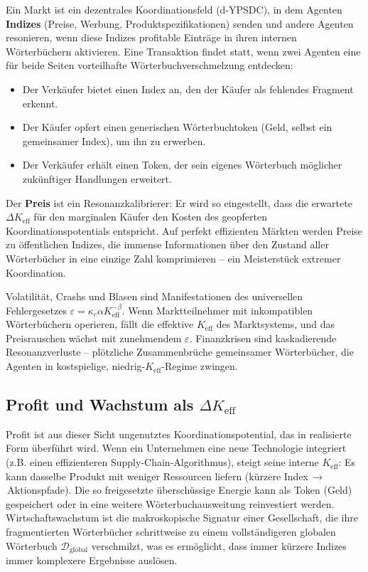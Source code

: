 \documentclass[12pt,a4paper]{article}
\newcommand{\Keff}{K_{\mathrm{eff}}}
\begin{document}
Ein Markt ist ein dezentrales Koordinationsfeld (d‑YPSDC), in dem Agenten \textbf{Indizes} (Preise, Werbung, Produktspezifikationen) senden und andere Agenten resonieren, wenn diese Indizes profitable Einträge in ihren internen Wörterbüchern aktivieren. Eine Transaktion findet statt, wenn zwei Agenten eine für beide Seiten vorteilhafte Wörterbuchverschmelzung entdecken:
\begin{itemize}[leftmargin=*]
	\item Der Verkäufer bietet einen Index an, den der Käufer als fehlendes Fragment erkennt.
	\item Der Käufer opfert einen generischen Wörterbuchtoken (Geld, selbst ein gemeinsamer Index), um ihn zu erwerben.
	\item Der Verkäufer erhält einen Token, der sein eigenes Wörterbuch möglicher zukünftiger Handlungen erweitert.
\end{itemize}
Der \textbf{Preis} ist ein Resonanzkalibrierer: Er wird so eingestellt, dass die erwartete \(\Delta\Keff\) für den marginalen Käufer den Kosten des geopferten Koordinationspotentials entspricht. Auf perfekt effizienten Märkten werden Preise zu öffentlichen Indizes, die immense Informationen über den Zustand aller Wörterbücher in eine einzige Zahl komprimieren – ein Meisterstück extremer Koordination.

Volatilität, Crashs und Blasen sind Manifestationen des universellen Fehlergesetzes \(\varepsilon = \kappa_c \alpha \Keff^{-\beta}\). Wenn Marktteilnehmer mit inkompatiblen Wörterbüchern operieren, fällt die effektive \(\Keff\) des Marktsystems, und das Preisrauschen wächst mit zunehmendem \(\varepsilon\). Finanzkrisen sind kaskadierende Resonanzverluste – plötzliche Zusammenbrüche gemeinsamer Wörterbücher, die Agenten in kostspielige, niedrig-\(\Keff\)-Regime zwingen.

\subsection{Profit und Wachstum als \(\Delta\Keff\)}

Profit ist aus dieser Sicht ungenutztes Koordinationspotential, das in realisierte Form überführt wird. Wenn ein Unternehmen eine neue Technologie integriert (z.B. einen effizienteren Supply-Chain-Algorithmus), steigt seine interne \(\Keff\): Es kann dasselbe Produkt mit weniger Ressourcen liefern (kürzere Index \(\rightarrow\) Aktionspfade). Die so freigesetzte überschüssige Energie kann als Token (Geld) gespeichert oder in eine weitere Wörterbuchausweitung reinvestiert werden. Wirtschaftswachstum ist die makroskopische Signatur einer Gesellschaft, die ihre fragmentierten Wörterbücher schrittweise zu einem vollständigeren globalen Wörterbuch \(\mathcal{D}_{\text{global}}\) verschmilzt, was es ermöglicht, dass immer kürzere Indizes immer komplexere Ergebnisse auslösen.
\end{document}
